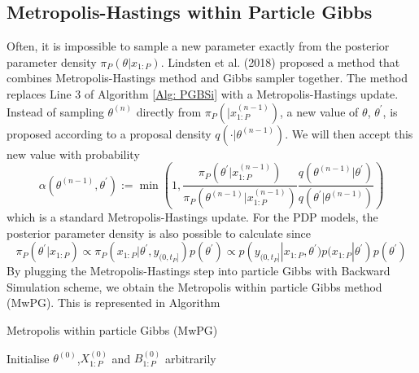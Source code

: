 \documentclass[12pt,a4paper]{article}
\begin{document}
\subsection{Metropolis-Hastings within Particle Gibbs}
Often, it is impossible to sample a new parameter exactly from the posterior parameter density $\pi_P\left(\theta|x_{1:P}\right)$. Lindsten et al. (2018) proposed a method that combines Metropolis-Hastings method and Gibbs sampler together. The method replaces Line 3 of Algorithm \ref{Alg: PGBSi} with a Metropolis-Hastings update. Instead of sampling $\theta^{(n)}$ directly from $\pi_P\left(|x_{1:P}^{(n-1)}\right)$, a new value of $\theta$, $\theta^{'}$, is proposed according to a proposal density $q\left(\cdot|\theta^{(n-1)}\right)$. We will then accept this new value with probability 
\begin{equation}
    \label{AcceptanceRate}
    \alpha\left(\theta^{(n-1)},\theta^{'}\right) := \min \left(1,\frac{\pi_{P}\left(\theta^{'}|x_{1:P}^{(n-1)}\right)}{\pi_P\left(\theta^{(n-1)}|x_{1:P}^{(n-1)}\right)}\frac{q\left(\theta^{(n-1)}|\theta^{'}\right)}{q\left(\theta^{'}|\theta^{(n-1)}\right)}\right)
\end{equation}
which is a standard Metropolis-Hastings update. For the PDP models, the posterior parameter density is also possible to calculate since 
$$\pi_P\left(\theta^{'}|x_{1:P}\right) \propto \pi_P\left(x_{1:P}|\theta^{'},y_{(0,t_P]}\right)p\left(\theta^{'}\right)\propto p\left(y_{(0,t_P]}|x_{1:P},\theta^{'})p(x_{1:P}|\theta^{'}\right)p\left(\theta^{'}\right)$$
By plugging the Metropolis-Hastings step into particle Gibbs with Backward Simulation scheme, we obtain the Metropolis within particle Gibbs method (MwPG). This is represented in Algorithm
\begin{algorithm}[htb!]
    \caption{Metropolis within particle Gibbs (MwPG)}
        Initialise $\theta^{(0)}$,$X_{1:P}^{(0)}$ and $B_{1:P}^{(0)}$ arbitrarily\;
    \label{Alg:Metropolis within PG}
\end{algorithm}
\end{document}
